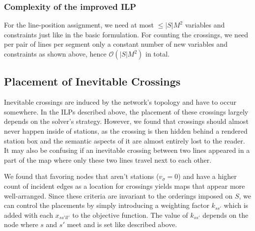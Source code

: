 \documentclass{llncs}
\begin{document}
\subsubsection{Complexity of the improved ILP}
For the line-position assignment, we need at most $\leq |S|M^{2}$ variables and constraints just like in the basic formulation. For counting the  crossings, we need per pair of lines per segment only a constant number of new variables and constraints as shown above, hence $\mathcal{O}(|S|M^{2})$ in total.

\subsection{Placement of Inevitable Crossings}\label{SEC:crossing_placement}

Inevitable crossings are induced by the network's topology and have to occur somewhere. In the ILPs described above, the placement of these crossings largely depends on the solver's strategy.
However, we found that crossings should almost never happen inside of stations, as the crossing is then hidden behind a rendered station box and the semantic aspects of it are almost entirely lost to the reader. It may also be confusing if an inevitable crossing between two lines appeared in a part of the map where only these two lines travel next to each other.

We found that favoring nodes that aren't stations ($v_\sigma = 0$) and have a higher count of incident edges as a location for crossings yields maps that appear more well-arranged.
Since these criteria are invariant to the orderings imposed on $S$, we can control the placements by simply introducing a weighting factor $k_{ss'}$ which is added with each $x_{ss'll'}$ to the objective function.
The value of $k_{ss'}$ depends on the node where $s$ and $s'$ meet and is set like described above.
\end{document}
